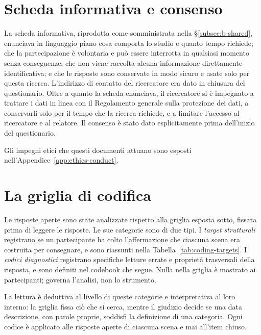 \section{Scheda informativa e consenso}
\label{app:b-consent}

La scheda informativa, riprodotta come somministrata nella \S\ref{subsec:b-shared}, enunciava in linguaggio piano cosa comporta lo studio e quanto tempo richiede; che la partecipazione è volontaria e può essere interrotta in qualsiasi momento senza conseguenze; che non viene raccolta alcuna informazione direttamente identificativa; e che le risposte sono conservate in modo sicuro e usate solo per questa ricerca. L'indirizzo di contatto del ricercatore era dato in chiusura del questionario. Oltre a quanto la scheda enunciava, il ricercatore si è impegnato a trattare i dati in linea con il Regolamento generale sulla protezione dei dati, a conservarli solo per il tempo che la ricerca richiede, e a limitare l'accesso al ricercatore e al relatore. Il consenso è stato dato esplicitamente prima dell'inizio del questionario.


Gli impegni etici che questi documenti attuano sono esposti nell'Appendice~\ref{app:ethics-conduct}.

\section{La griglia di codifica}
\label{sec:app-coding-grid}

Le risposte aperte sono state analizzate rispetto alla griglia esposta sotto, fissata prima di leggere le risposte. Le sue categorie sono di due tipi. I \emph{target strutturali} registrano se un partecipante ha colto l'affermazione che ciascuna scena era costruita per consegnare, e sono riassunti nella Tabella~\ref{tab:coding-targets}. I \emph{codici diagnostici} registrano specifiche letture errate e proprietà trasversali della risposta, e sono definiti nel codebook che segue. Nulla nella griglia è mostrato ai partecipanti; governa l'analisi, non lo strumento.

La lettura è deduttiva al livello di queste categorie e interpretativa al loro interno: la griglia fissa ciò che si cerca, mentre il giudizio decide se una data descrizione, con parole proprie, soddisfi la definizione di una categoria. Ogni codice è applicato alle risposte aperte di ciascuna scena e mai all'item chiuso.

